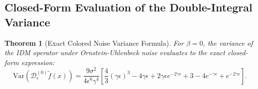 \documentclass[11pt,a4paper]{article}
\newtheorem{theorem}{Theorem}
\theoremstyle{definition}
\begin{document}
\subsection{Closed-Form Evaluation of the Double-Integral Variance}

\begin{theorem}[Exact Colored Noise Variance Formula]
\label{thm:exact_colored_variance}
\label{thm:colored_noise}
For $\beta = 0$, the variance of the IDM operator under Ornstein-Uhlenbeck noise evaluates to the exact closed-form expression:
\begin{equation}
\text{Var}\left(\mathcal{D}_\epsilon^{(0)} \tilde{f}(x)\right) = \frac{9\sigma^2}{4\epsilon^6 \gamma^4} \left[ \frac{4}{3}(\gamma \epsilon)^3 - 4\gamma \epsilon + 2\gamma \epsilon e^{-2\gamma \epsilon} + 3 - 4e^{-\gamma \epsilon} + e^{-2\gamma \epsilon} \right].
\label{eq:exact_ou_variance}
\end{equation}
\end{theorem}
\end{document}
